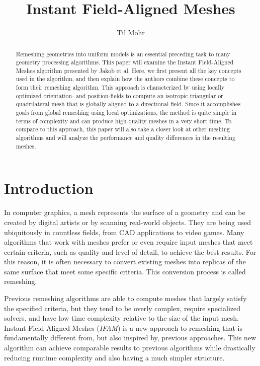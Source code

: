 \documentclass{ACGSeminar}
\begin{document}
\title{Instant Field-Aligned Meshes}

\author{Til Mohr}


\maketitle


\begin{abstract}
Remeshing geometries into uniform models is an essential preceding task to many geometry processing algorithms. This paper will examine the Instant Field-Aligned Meshes algorithm presented by Jakob et al. Here, we first present all the key concepts used in the algorithm, and then explain how the authors combine these concepts to form their remeshing algorithm. This approach is characterized by using locally optimized orientation- and position-fields to compute an isotropic triangular or quadrilateral mesh that is globally aligned to a directional field. Since it accomplishes goals from global remeshing using local optimizations, the method is quite simple in terms of complexity and can produce high-quality meshes in a very short time. To compare to this approach, this paper will also take a closer look at other meshing algorithms and will analyze the performance and quality differences in the resulting meshes.
\end{abstract}

\tableofcontents

\newpage

\section{Introduction}
In computer graphics, a mesh represents the surface of a geometry and can be created by digital artists or by scanning real-world objects. They are being used ubiquitously in countless fields, from CAD applications to video games. Many algorithms that work with meshes prefer or even require input meshes that meet certain criteria, such as quality and level of detail, to achieve the best results. For this reason, it is often necessary to convert existing meshes into replicas of the same surface that meet some specific criteria. This conversion process is called remeshing.\bigskip

Previous remeshing algorithms are able to compute meshes that largely satisfy the specified criteria, but they tend to be overly complex, require specialized solvers, and have low time complexity relative to the size of the input mesh. Instant Field-Aligned Meshes (\textit{IFAM}) is a new approach to remeshing that is fundamentally different from, but also inspired by, previous approaches. This new algorithm can achieve comparable results to previous algorithms while drastically reducing runtime complexity and also having a much simpler structure.\bigskip
\end{document}
